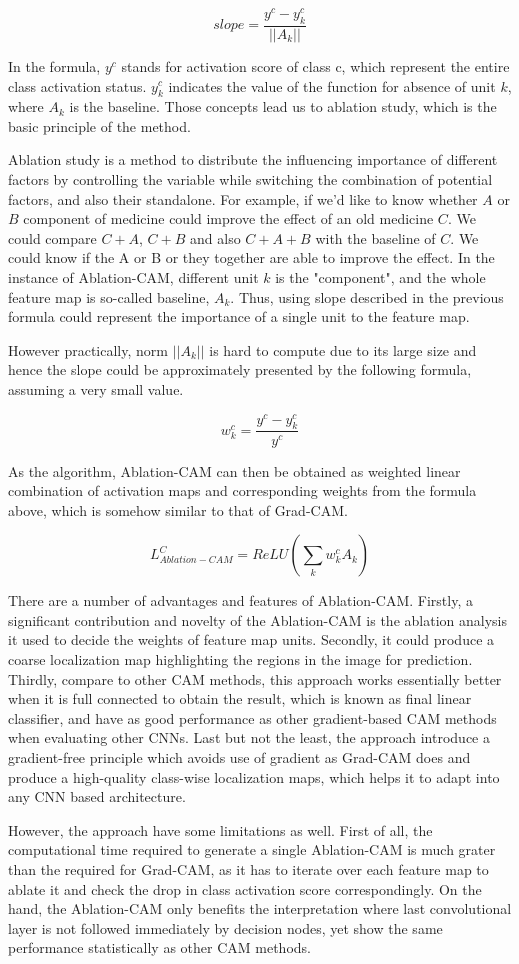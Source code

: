 \documentclass[conference]{IEEEtran}
\begin{document}
$$slope = \frac{y^c-y^c_k}{||A_k||}$$

In the formula, $y^c$ stands for activation score of class c, which represent the entire class activation status. $y^c_k$ indicates the value of the function for absence of unit $k$, where $A_k$ is the baseline. Those concepts lead us to ablation study, which is the basic principle of the method.\par
Ablation study is a method to distribute the influencing importance of different factors by controlling the variable while switching the combination of potential factors, and also their standalone. For example, if we'd like to know whether $A$ or $B$ component of medicine could improve the effect of an old medicine $C$. We could compare $C+A$, $C+B$ and also $C+A+B$ with the baseline of $C$. We could know if the A or B or they together are able to improve the effect. In the instance of Ablation-CAM, different unit $k$ is the "component", and the whole feature map is so-called baseline, $A_k$. Thus, using slope described in the previous formula could represent the importance of a single unit to the feature map.\par
However practically, norm $||A_k||$ is hard to compute due to its large size and hence the slope could be approximately presented by the following formula, assuming a very small value.

$$w^c_k = \frac{y^c-y^c_k}{y^c}$$

As the algorithm, Ablation-CAM can then be obtained as weighted linear combination of activation maps and corresponding weights from the formula above, which is somehow similar to that of Grad-CAM.

$$L^C_{Ablation-CAM}=ReLU(\sum_k {w^c_k}{A_k})$$

There are a number of advantages and features of Ablation-CAM. Firstly, a significant contribution and novelty of the Ablation-CAM is the ablation analysis it used to decide the weights of feature map units. Secondly, it could produce a coarse localization map highlighting the regions in the image for prediction. Thirdly, compare to other CAM methods, this approach works essentially better when it is full connected to obtain the result, which is known as final linear classifier, and have as good performance as other gradient-based CAM methods when evaluating other CNNs. Last but not the least, the approach introduce a gradient-free principle which avoids use of gradient as Grad-CAM does and produce a high-quality class-wise localization maps, which helps it to adapt into any CNN based architecture.\par
However, the approach have some limitations as well. First of all, the computational time required to generate a single Ablation-CAM is much grater than the required for Grad-CAM, as it has to iterate over each feature map to ablate it and check the drop in class activation score correspondingly. On the hand, the Ablation-CAM only benefits the interpretation where last convolutional layer is not followed immediately by decision nodes, yet show the same performance statistically as other CAM methods.\par
\end{document}
